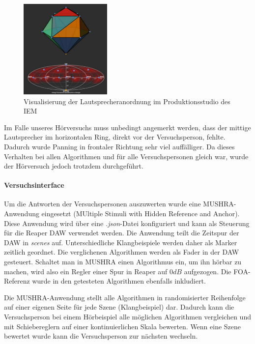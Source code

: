 \begin{figure}[!ht]
  \centering
  \includegraphics[width=0.4\textwidth]{aufbau/plots/speaker_pos_prod_studio.png}
  \caption{Visualisierung der Lautsprecheranordnung im Produktionsstudio des IEM \protect\footnotemark}
  \label{fig:aufb:prodstud}
\end{figure}


Im Falle unseres Hörversuchs muss unbedingt angemerkt werden, dass der mittige Lautsprecher im horizontalen Ring, direkt vor der Versuchsperson, fehlte. Dadurch wurde Panning in frontaler Richtung sehr viel auffälliger. Da dieses Verhalten bei allen Algorithmen und für alle Versuchspersonen gleich war, wurde der Hörversuch jedoch trotzdem durchgeführt.


\paragraph{Versuchsinterface}
Um die Antworten der Versuchspersonen auszuwerten wurde eine MUSHRA-Anwendung eingesetzt (MUltiple Stimuli with Hidden Reference and Anchor). Diese Anwendung wird über eine \textit{.json}-Datei konfiguriert und kann als Steuerung für die Reaper DAW verwendet werden. Die Anwendung teilt die Zeitspur der DAW in \textit{scenes} auf. Unterschiedliche Klangbeispiele werden daher als Marker zeitlich geordnet. Die verglichenen Algorithmen werden als Fader in der DAW gesteuert. Schaltet man in MUSHRA einen Algorithmus ein, um ihn hörbar zu machen, wird also ein Regler einer Spur in Reaper auf $0dB$ aufgezogen. Die FOA-Referenz wurde in den getesteten Algorithmen ebenfalls inkludiert.

Die MUSHRA-Anwendung stellt alle Algorithmen in randomisierter Reihenfolge auf einer eigenen Seite für jede Szene (Klangbeispiel) dar. Dadurch kann die Versuchsperson bei einem Hörbeispiel alle möglichen Algorithmen vergleichen und mit Schiebereglern auf einer kontinuierlichen Skala bewerten. Wenn eine Szene bewertet wurde kann die Versuchsperson zur nächsten wechseln.